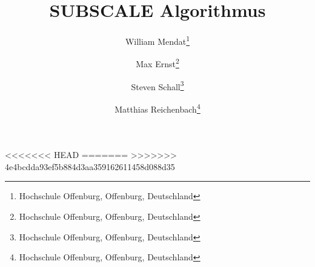 \documentclass[]{lni}
\begin{document}
    \title[SUBSCALE]{SUBSCALE Algorithmus}
    \author[William Mendat \and Max Ernst \and Steven Schall \and Matthias Reichenbach]
    {William Mendat\footnote{Hochschule Offenburg, Offenburg,
        Deutschland } \and
    Max Ernst\footnote{Hochschule Offenburg, Offenburg,
        Deutschland } \and
    Steven Schall\footnote{Hochschule Offenburg, Offenburg,
        Deutschland } \and
    Matthias Reichenbach\footnote{Hochschule Offenburg, Offenburg,
        Deutschland }}
<<<<<<< HEAD
=======
>>>>>>> 4e4bcdda93ef5b884d3aa359162611458d088d35
    \maketitle

    
    
    
    
    
    
    
    


\end{document}
